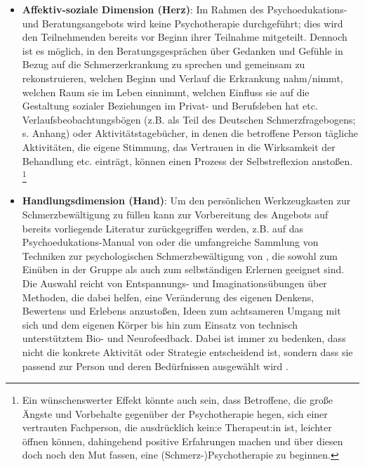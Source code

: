 \documentclass[
  twoside,
  parskip=half-,
  paper=176mm:246mm,
  BCOR=14mm,
  DIV=14,
]{scrreprt}
\begin{document}
\begin{praxis}
\begin{itemize}
  \item \textbf{Affektiv-soziale Dimension (Herz)}: Im Rahmen des Psychoedukations- und Beratungsangebots wird keine Psychotherapie durchgeführt; dies wird den Teilnehmenden bereits vor Beginn ihrer Teilnahme mitgeteilt. Dennoch ist es möglich, in den Beratungsgesprächen über Gedanken und Gefühle in Bezug auf die Schmerzerkrankung zu sprechen und gemeinsam zu rekonstruieren, welchen Beginn und Verlauf die Erkrankung nahm/nimmt, welchen Raum sie im Leben einnimmt, welchen Einfluss sie auf die Gestaltung sozialer Beziehungen im Privat- und Berufsleben hat etc. Verlaufsbeobachtungsbögen (z.B. als Teil des Deutschen Schmerzfragebogens; s. Anhang) oder Aktivitätstagebücher, in denen die betroffene Person tägliche Aktivitäten, die eigene Stimmung, das Vertrauen in die Wirksamkeit der Behandlung etc. einträgt, können einen Prozess der Selbstreflexion anstoßen. \footnote{Ein wünschenswerter Effekt könnte auch sein, dass Betroffene, die große Ängste und Vorbehalte gegenüber der Psychotherapie hegen, sich einer vertrauten Fachperson, die ausdrücklich kein:e Therapeut:in ist, leichter öffnen können, dahingehend positive Erfahrungen machen und über diesen  doch noch den Mut fassen, eine (Schmerz-)Psychotherapie zu beginnen.}
  \item \textbf{Handlungsdimension (Hand)}: Um den persönlichen Werkzeugkasten zur Schmerzbewältigung zu füllen kann zur Vorbereitung des Angebots auf bereits vorliegende Literatur zurückgegriffen werden, z.B. auf das Psychoedukations-Manual von \textcite{wachter} oder die umfangreiche Sammlung von Techniken zur psychologischen Schmerzbewältigung von \citeauthor{richter}, die sowohl zum Einüben in der Gruppe als auch zum selbständigen Erlernen geeignet sind. Die Auswahl reicht von Entspannungs- und Imaginationsübungen über Methoden, die dabei helfen, eine Veränderung des eigenen Denkens, Bewertens und Erlebens anzustoßen, Ideen zum achtsameren Umgang mit sich und dem eigenen Körper bis hin zum Einsatz von technisch unterstütztem Bio- und Neurofeedback. Dabei ist immer zu bedenken, dass nicht die konkrete Aktivität oder Strategie entscheidend ist, sondern dass sie passend zur Person und deren Bedürfnissen ausgewählt wird \autocite[vgl.][336]{HeftSchmerz5}.
\end{itemize}
\end{praxis}
\end{document}
